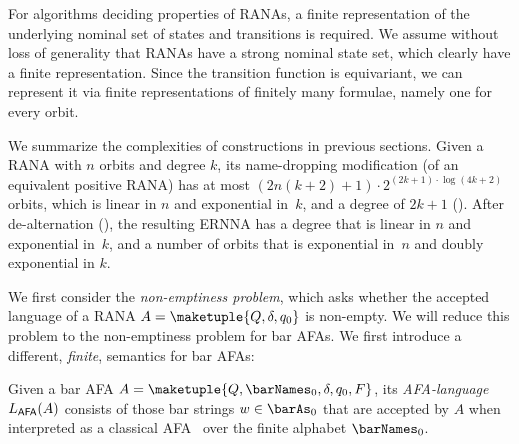 \documentclass[10pt, final, conference, a4paper, twocolumn]{IEEEtran}
\begin{document}
\begin{rem}
  For algorithms deciding properties of RANAs, a finite representation
  of the underlying nominal set of states and transitions is
  required.
  We assume without loss of generality that RANAs have a strong nominal
  state set, which clearly have a finite representation. Since the transition
  function is equivariant, we can represent it via finite representations of
  finitely many formulae, namely one for every orbit.
\end{rem}

\begin{rem} \label{rem:compConstr}
  We summarize the complexities of constructions in previous sections.
  Given a RANA with $n$ orbits and degree $k$, its name-dropping modification (of an equivalent positive RANA) has at most $(2n(k + 2)+1) \cdot 2^{(2k + 1) \cdot \log(4k + 2)}$ orbits, which is linear in $n$ and exponential in~$k$, and a degree of $2k + 1$ ().
  After de-alternation (), the resulting ERNNA has a degree that is linear in $n$ and exponential in~$k$, and  a number of orbits that is exponential in~$n$ and doubly exponential in $k$.
\end{rem}

We first consider the \emph{non-emptiness problem}, which asks whether the accepted language of a RANA $A = \maketuple{Q, \delta, q_0}$ is non-empty. We will reduce this problem to the non-emptiness problem for bar AFAs. We first introduce a different, \emph{finite}, semantics for bar AFAs:

\begin{defn}
  Given a bar AFA $A = \maketuple{Q, \barNames_0, \delta, q_0, F}$, its \emph{AFA-language}
  $L_{\textsf{\scriptsize AFA}}(A)$ consists of those bar strings $w \in \barAs_0$ that are accepted by $A$ when
  interpreted as a classical AFA~\cite{cks81} over the finite alphabet $\barNames_0$.
\end{defn}
\end{document}
